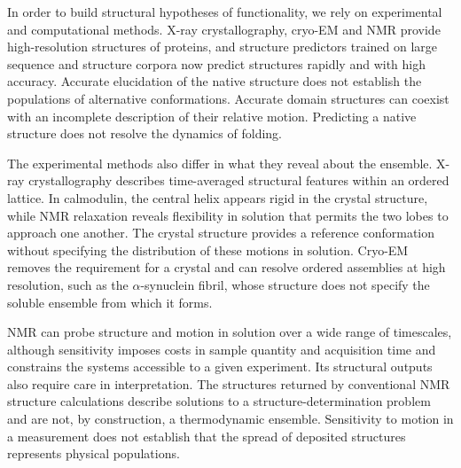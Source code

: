 In order to build structural hypotheses of functionality, we rely on experimental and computational methods. X-ray crystallography, cryo-EM and NMR provide high-resolution structures of proteins,\supercite{maveyraudProteinXrayCrystallography2020,baiHowCryoEMRevolutionizing2015,jamesAdvancesHydrogenDeuterium2022} and structure predictors trained on large sequence and structure corpora now predict structures rapidly and with high accuracy.\supercite{varadiAlphaFoldProteinStructure2022} Accurate elucidation of the native structure does not establish the populations of alternative conformations. Accurate domain structures can coexist with an incomplete description of their relative motion.\supercite{mccaffertyDoesAlphaFold2Model2023} Predicting a native structure does not resolve the dynamics of folding.\supercite{laneMillisecondsChallengesSimulation2013,wilsonAlphaFold2RoleDisordered2022,mccaffertyDoesAlphaFold2Model2023}

The experimental methods also differ in what they reveal about the ensemble. X-ray crystallography describes time-averaged structural features within an ordered lattice.\supercite{lisiAllosteryEnzymeCatalysis2017} In calmodulin, the central helix appears rigid in the crystal structure, while NMR relaxation reveals flexibility in solution that permits the two lobes to approach one another.\supercite{sapienzaUsingNMRStudy2010} The crystal structure provides a reference conformation without specifying the distribution of these motions in solution. Cryo-EM removes the requirement for a crystal and can resolve ordered assemblies at high resolution,\supercite{baiHowCryoEMRevolutionizing2015} such as the $\alpha$-synuclein fibril, whose structure does not specify the soluble ensemble from which it forms.

NMR can probe structure and motion in solution over a wide range of timescales, although sensitivity imposes costs in sample quantity and acquisition time and constrains the systems accessible to a given experiment.\supercite{klecknerIntroductionNMRbasedApproaches2011} Its structural outputs also require care in interpretation. The structures returned by conventional NMR structure calculations describe solutions to a structure-determination problem and are not, by construction, a thermodynamic ensemble.\supercite{bmsb2012ch12} Sensitivity to motion in a measurement does not establish that the spread of deposited structures represents physical populations.

